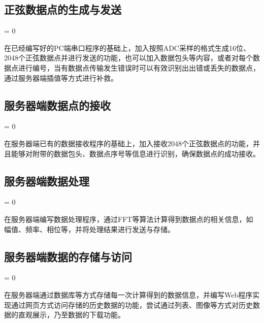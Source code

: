 \documentclass[a4paper,11pt]{ctexart}
\newcommand{\subpar}
{
	\par
	\hangafter = 0
	\setlength{\hangindent}{1em}
}
\begin{document}
\begin{spacing}{1.5}
\subsection{正弦数据点的生成与发送}
\subpar
在已经编写好的PC端串口程序的基础上，加入按照ADC采样的格式生成16位、2048个正弦数据点并进行发送的功能，也可以加入数据包头等内容，或者对每个数据点进行编号，当有数据点传输发生错误时可以有效识别出出错或丢失的数据点，通过服务器端插值等方式进行补救。
\subsection{服务器端数据点的接收}
\subpar
在服务器端已有的数据接收程序的基础上，加入接收2048个正弦数据点的功能，并且能够对附带的数据包头、数据点序号等信息进行识别，确保数据点的成功接收。

\subsection{服务器端数据处理}
\subpar
在服务器端编写数据处理程序，通过FFT等算法计算得到数据点的相关信息，如幅值、频率、相位等，并将处理结果进行发送与存储。

\subsection{服务器端数据的存储与访问}
\subpar
在服务器端通过数据库等方式存储每一次计算得到的数据信息，并编写Web程序实现通过网页方式访问存储的历史数据的功能，尝试通过列表、图像等方式对历史数据的直观展示，乃至数据的下载功能。





\end{spacing}


	
\end{document}
